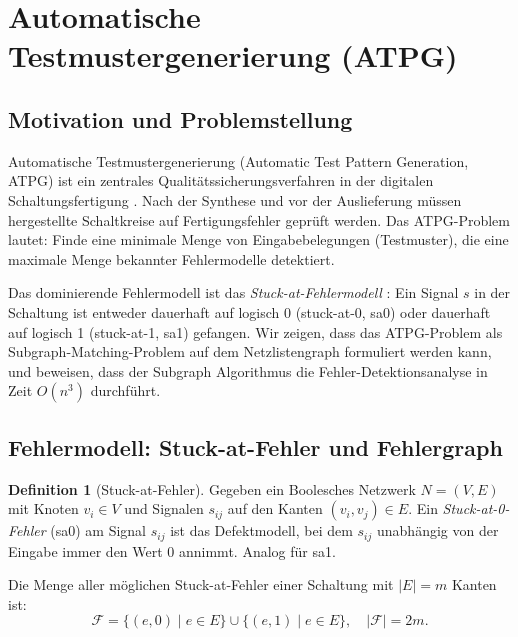 ﻿\documentclass[a4paper,12pt]{article}
\theoremstyle{definition}
\newtheorem{definition}{Definition}
\begin{document}
\section{Automatische Testmustergenerierung (ATPG)}

\subsection{Motivation und Problemstellung}

Automatische Testmustergenerierung (Automatic Test Pattern Generation, ATPG) ist ein
zentrales Qualitätssicherungsverfahren in der digitalen Schaltungsfertigung
\cite[Kap.~12]{ciletti2011}. Nach der Synthese und vor der Auslieferung müssen
hergestellte Schaltkreise auf Fertigungsfehler geprüft werden. Das ATPG-Problem
lautet: Finde eine minimale Menge von Eingabebelegungen (Testmuster), die eine maximale
Menge bekannter Fehlermodelle detektiert.

Das dominierende Fehlermodell ist das \emph{Stuck-at-Fehlermodell}
\cite[S.~820]{ciletti2011}: Ein Signal $s$ in der Schaltung ist entweder dauerhaft
auf logisch 0 (stuck-at-0, sa0) oder dauerhaft auf logisch 1 (stuck-at-1, sa1)
gefangen. Wir zeigen, dass das ATPG-Problem als Subgraph-Matching-Problem auf dem
Netzlistengraph formuliert werden kann, und beweisen, dass der Subgraph Algorithmus
die Fehler-Detektionsanalyse in Zeit $O(n^3)$ durchführt.

\subsection{Fehlermodell: Stuck-at-Fehler und Fehlergraph}

\begin{definition}[Stuck-at-Fehler]\label{def:stuckat}
  Gegeben ein Boolesches Netzwerk $N = (V, E)$ mit Knoten $v_i \in V$ und Signalen
  $s_{ij}$ auf den Kanten $(v_i, v_j) \in E$. Ein \emph{Stuck-at-0-Fehler} (sa0) am
  Signal $s_{ij}$ ist das Defektmodell, bei dem $s_{ij}$ unabhängig von der Eingabe
  immer den Wert 0 annimmt. Analog für sa1.

  Die Menge aller möglichen Stuck-at-Fehler einer Schaltung mit $|E| = m$ Kanten ist:
  \[
    \mathcal{F} = \{(e, 0) \mid e \in E\} \cup \{(e, 1) \mid e \in E\},
    \quad |\mathcal{F}| = 2m.
  \]
\end{definition}
\end{document}
